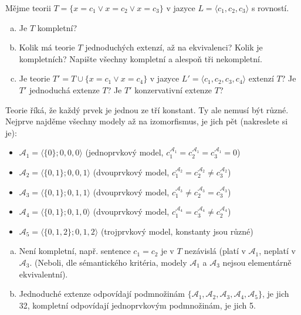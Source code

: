 \begin{problem}

    Mějme teorii $T=\{x=c_1 \vee x=c_2 \vee x=c_3\}$ v jazyce $L=\langle c_1,c_2,c_3\rangle$ s rovností.
    \begin{enumerate}[(a)]     
        \item Je $T$ kompletní?
        \item Kolik má teorie $T$ jednoduchých extenzí, až na ekvivalenci? Kolik je kompletních? Napište všechny kompletní a alespoň tři nekompletní.
        \item Je teorie $T'=T\cup\{x=c_1 \vee x=c_4\}$ v jazyce $L'=\langle c_1,c_2,c_3,c_4\rangle$ extenzí $T$? Je $T'$ jednoduchá extenze $T$? Je $T'$ konzervativní extenze $T$?
    \end{enumerate}

    \begin{solution}
        
        Teorie říká, že každý prvek je jednou ze tří konstant. Ty ale nemusí být různé. Nejprve najděme všechny modely až na izomorfismus, je jich pět (nakreslete si je):
        \begin{itemize}
            \item $\mathcal A_1=\langle\{0\};0,0,0\rangle$ (jednoprvkový model, $c_1^{\mathcal A_1}=c_2^{\mathcal A_1}=c_3^{\mathcal A_1}=0$)
            \item $\mathcal A_2=\langle\{0,1\};0,0,1\rangle$ (dvouprvkový model, $c_1^{\mathcal A_2}=c_2^{\mathcal A_2}\neq c_3^{\mathcal A_2}$)
            \item $\mathcal A_3=\langle\{0,1\};0,1,1\rangle$ (dvouprvkový model, $c_1^{\mathcal A_3}\neq c_2^{\mathcal A_3}=c_3^{\mathcal A_3}$) 
            \item $\mathcal A_4=\langle\{0,1\};0,1,0\rangle$ (dvouprvkový model, $c_1^{\mathcal A_4}=c_3^{\mathcal A_4}\neq c_2^{\mathcal A_4}$)
            \item $\mathcal A_5=\langle\{0,1,2\};0,1,2\rangle$ (trojprvkový model, konstanty jsou různé)
        \end{itemize}
        \begin{enumerate}[(a)]
            \item Není kompletní, např. sentence $c_1=c_2$ je v $T$ nezávislá (platí v $\mathcal A_1$,  neplatí v $\mathcal A_3$. (Neboli, dle sémantického kritéria, modely $\mathcal A_1$ a $\mathcal A_3$ nejsou elementárně ekvivalentní).
            \item Jednoduché extenze odpovídají podmnožinám $\{\mathcal A_1,\mathcal A_2,\mathcal A_3,\mathcal A_4,\mathcal A_5\}$, je jich 32, kompletní odpovídají jednoprvkovým podmnožinám, je jich 5.
            

\end{enumerate}
\end{solution}
\end{problem}
